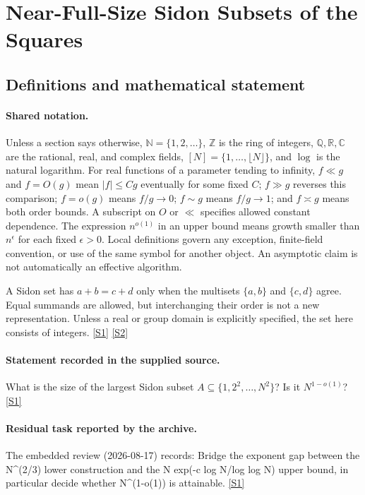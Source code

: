 \documentclass[11pt,a4paper]{article}
\newcommand{\N}{\mathbb{N}}
\newcommand{\Z}{\mathbb{Z}}
\newcommand{\Q}{\mathbb{Q}}
\newcommand{\R}{\mathbb{R}}
\newcommand{\C}{\mathbb{C}}
\newcommand{\sref}[2]{\hyperlink{source:#1:#2}{[S#2]}}
\begin{document}
\section{Near-Full-Size Sidon Subsets of the Squares}\label{statement}


\subsection{Definitions and mathematical statement}

\paragraph{Shared notation.}Unless a section says otherwise, $\N=\{1,2,\ldots\}$,
$\Z$ is the ring of integers, $\Q,\R,\C$ are the rational, real, and complex
fields, $[N]=\{1,\ldots,\lfloor N\rfloor\}$, and $\log$ is the natural
logarithm. For real functions of a parameter tending to infinity,
$f\ll g$ and $f=O(g)$ mean $|f|\leq Cg$ eventually for some fixed $C$;
$f\gg g$ reverses this comparison; $f=o(g)$ means $f/g\to0$;
$f\sim g$ means $f/g\to1$; and $f\asymp g$ means both order bounds.
A subscript on $O$ or $\ll$ specifies allowed constant dependence.
The expression $n^{o(1)}$ in an upper bound means growth smaller than
$n^\epsilon$ for each fixed $\epsilon>0$. Local definitions govern any
exception, finite-field convention, or use of the same symbol for another
object. An asymptotic claim is not automatically an effective algorithm.



A Sidon set has $a+b=c+d$ only when the multisets $\{a,b\}$ and $\{c,d\}$ agree. Equal summands are allowed, but interchanging their order is not a new representation. Unless a real or group domain is explicitly specified, the set here consists of integers. \sref{statement}{1} \sref{statement}{2}

\paragraph{Statement recorded in the supplied source.}
What is the size of the largest Sidon subset $A\subseteq\{1,2^2,\ldots,N^2\}$? Is it $N^{1-o(1)}$? \sref{statement}{1}

\paragraph{Residual task reported by the archive.}

The embedded review (2026-08-17) records: Bridge the exponent gap between the N\textasciicircum{}(2/3) lower construction and the N exp(-c log N/log log N) upper bound, in particular decide whether N\textasciicircum{}(1-o(1)) is attainable. \sref{statement}{1}
\end{document}
